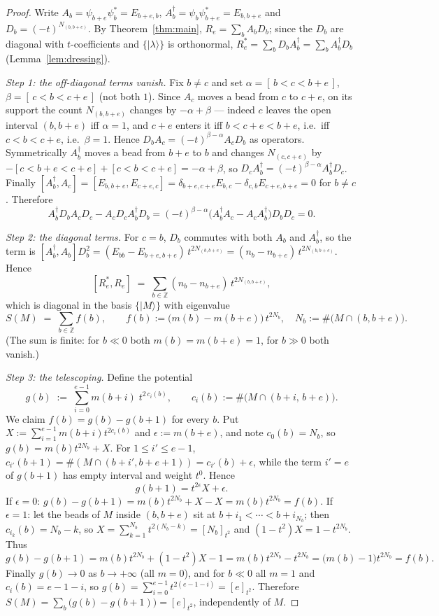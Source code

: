\documentclass[11pt]{article}
\theoremstyle{definition}
\newcommand{\Z}{\mathbb{Z}}
\begin{document}
\begin{proof}
Write $A_b=\psi_{b+e}\psi_b^{*}=E_{b+e,b}$, $A_b^{\dagger}=\psi_b\psi_{b+e}^{*}
=E_{b,b+e}$ and $D_b=(-t)^{N_{(b,b+e)}}$.  By Theorem~\ref{thm:main},
$R_e=\sum_b A_bD_b$; since the $D_b$ are diagonal with $t$-coefficients and
$\{|\lambda\rangle\}$ is orthonormal, $R_e^{*}=\sum_b D_bA_b^{\dagger}
=\sum_b A_b^{\dagger}D_b$ (Lemma~\ref{lem:dressing}).

\emph{Step 1: the off-diagonal terms vanish.}  Fix $b\neq c$ and set
$\alpha=[\,b<c<b+e\,]$, $\beta=[\,c<b<c+e\,]$ (not both $1$).  Since $A_c$ moves a
bead from $c$ to $c+e$, on its support the count $N_{(b,b+e)}$ changes by
$-\alpha+\beta$ --- indeed $c$ leaves the open interval $(b,b+e)$ iff $\alpha=1$,
and $c+e$ enters it iff $b<c+e<b+e$, i.e.\ iff $c<b<c+e$, i.e.\ $\beta=1$.  Hence
$D_bA_c=(-t)^{\beta-\alpha}A_cD_b$ as operators.  Symmetrically $A_b^{\dagger}$
moves a bead from $b+e$ to $b$ and changes $N_{(c,c+e)}$ by
$-[c<b+e<c+e]+[c<b<c+e]=-\alpha+\beta$, so $D_cA_b^{\dagger}=
(-t)^{\beta-\alpha}A_b^{\dagger}D_c$.  Finally
$[A_b^{\dagger},A_c]=[E_{b,b+e},E_{c+e,c}]
=\delta_{b+e,c+e}E_{b,c}-\delta_{c,b}E_{c+e,b+e}=0$ for $b\neq c$.  Therefore
\[
 A_b^{\dagger}D_bA_cD_c-A_cD_cA_b^{\dagger}D_b
 =(-t)^{\beta-\alpha}\bigl(A_b^{\dagger}A_c-A_cA_b^{\dagger}\bigr)D_bD_c=0 .
\]

\emph{Step 2: the diagonal terms.}  For $c=b$, $D_b$ commutes with both $A_b$ and
$A_b^{\dagger}$, so the term is
$[A_b^{\dagger},A_b]D_b^{2}=(E_{bb}-E_{b+e,b+e})\,t^{2N_{(b,b+e)}}
=(n_b-n_{b+e})\,t^{2N_{(b,b+e)}}$.  Hence
\[
   [R_e^{*},R_e]\;=\;\sum_{b\in\Z}(n_b-n_{b+e})\,t^{2N_{(b,b+e)}} ,
\]
which is diagonal in the basis $\{|M\rangle\}$ with eigenvalue
\[
   S(M)\;=\;\sum_{b\in\Z} f(b),\qquad
   f(b):=\bigl(m(b)-m(b+e)\bigr)\,t^{2N_b},\quad
   N_b:=\#\bigl(M\cap(b,b+e)\bigr).
\]
(The sum is finite: for $b\ll0$ both $m(b)=m(b+e)=1$, for $b\gg0$ both vanish.)

\emph{Step 3: the telescoping.}  Define the potential
\[
  g(b)\;:=\;\sum_{i=0}^{e-1} m(b+i)\;t^{2\,c_i(b)},\qquad
  c_i(b):=\#\bigl(M\cap(b+i,\,b+e)\bigr).
\]
We claim $f(b)=g(b)-g(b+1)$ for every $b$.  Put
$X:=\sum_{i=1}^{e-1}m(b+i)t^{2c_i(b)}$ and $\epsilon:=m(b+e)$, and note
$c_0(b)=N_b$, so $g(b)=m(b)t^{2N_b}+X$.  For $1\le i'\le e-1$,
$c_{i'}(b+1)=\#(M\cap(b+i',b+e+1))=c_{i'}(b)+\epsilon$, while the term $i'=e$ of
$g(b+1)$ has empty interval and weight $t^{0}$.  Hence
\[
   g(b+1)=t^{2\epsilon}X+\epsilon .
\]
If $\epsilon=0$: $g(b)-g(b+1)=m(b)t^{2N_b}+X-X=m(b)t^{2N_b}=f(b)$.
If $\epsilon=1$: let the beads of $M$ inside $(b,b+e)$ sit at
$b+i_1<\cdots<b+i_{N_b}$; then $c_{i_k}(b)=N_b-k$, so
$X=\sum_{k=1}^{N_b}t^{2(N_b-k)}=[N_b]_{t^2}$ and $(1-t^{2})X=1-t^{2N_b}$.  Thus
\[
 g(b)-g(b+1)=m(b)t^{2N_b}+(1-t^{2})X-1=m(b)t^{2N_b}-t^{2N_b}=\bigl(m(b)-1\bigr)t^{2N_b}
 =f(b).
\]
Finally $g(b)\to0$ as $b\to+\infty$ (all $m=0$), and for $b\ll0$ all $m=1$ and
$c_i(b)=e-1-i$, so $g(b)=\sum_{i=0}^{e-1}t^{2(e-1-i)}=[e]_{t^{2}}$.  Therefore
$S(M)=\sum_b\bigl(g(b)-g(b+1)\bigr)=[e]_{t^{2}}$, independently of $M$.
\end{proof}
\end{document}
